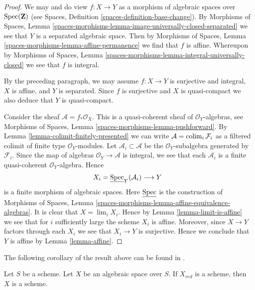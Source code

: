 \begin{proof}
We may and do view $f : X \to Y$ as a morphism of algebraic spaces over
$\mathop{\mathrm{Spec}}(\mathbf{Z})$ (see
Spaces, Definition \ref{spaces-definition-base-change}).
By Morphisms of Spaces, Lemma
\ref{spaces-morphisms-lemma-image-universally-closed-separated}
we see that $Y$ is a separated algebraic space. Then by
Morphisms of Spaces, Lemma \ref{spaces-morphisms-lemma-affine-permanence}
we find that $f$ is affine. Whereupon by
Morphisms of Spaces, Lemma
\ref{spaces-morphisms-lemma-integral-universally-closed}
we see that $f$ is integral.

\medskip\noindent
By the preceding paragraph, we may assume $f : X \to Y$
is surjective and integral, $X$ is affine, and $Y$ is separated.
Since $f$ is surjective and $X$ is quasi-compact we also deduce that $Y$ is
quasi-compact.

\medskip\noindent
Consider the sheaf $\mathcal{A} = f_*\mathcal{O}_X$.
This is a quasi-coherent sheaf of $\mathcal{O}_Y$-algebras, see
Morphisms of Spaces, Lemma \ref{spaces-morphisms-lemma-pushforward}.
By Lemma \ref{lemma-colimit-finitely-presented}
we can write $\mathcal{A} = \mathop{\mathrm{colim}}\nolimits_i \mathcal{F}_i$ as a filtered
colimit of finite type $\mathcal{O}_Y$-modules. Let
$\mathcal{A}_i \subset \mathcal{A}$ be the $\mathcal{O}_Y$-subalgebra
generated by $\mathcal{F}_i$. Since the map of algebras
$\mathcal{O}_Y \to \mathcal{A}$ is integral, we see that each $\mathcal{A}_i$
is a finite quasi-coherent $\mathcal{O}_Y$-algebra. Hence
$$
X_i = \underline{\mathop{\mathrm{Spec}}}_Y(\mathcal{A}_i) \longrightarrow Y
$$
is a finite morphism of algebraic spaces. Here 
$\underline{\mathop{\mathrm{Spec}}}$ is the construction of Morphisms of Spaces, Lemma
\ref{spaces-morphisms-lemma-affine-equivalence-algebras}.
It is clear
that $X = \lim_i X_i$. Hence by
Lemma \ref{lemma-limit-is-affine}
we see that for $i$ sufficiently large the scheme $X_i$ is affine.
Moreover, since $X \to Y$ factors through each $X_i$ we see that
$X_i \to Y$ is surjective. Hence we conclude that $Y$ is affine by
Lemma \ref{lemma-affine}.
\end{proof}

\noindent
The following corollary of the result above can be found in
\cite{CLO}.

\begin{lemma}
\label{lemma-reduction-scheme}
\begin{reference}
\cite[3.1.12]{CLO}
\end{reference}
Let $S$ be a scheme. Let $X$ be an algebraic space over $S$.
If $X_{red}$ is a scheme, then $X$ is a scheme.
\end{lemma}

